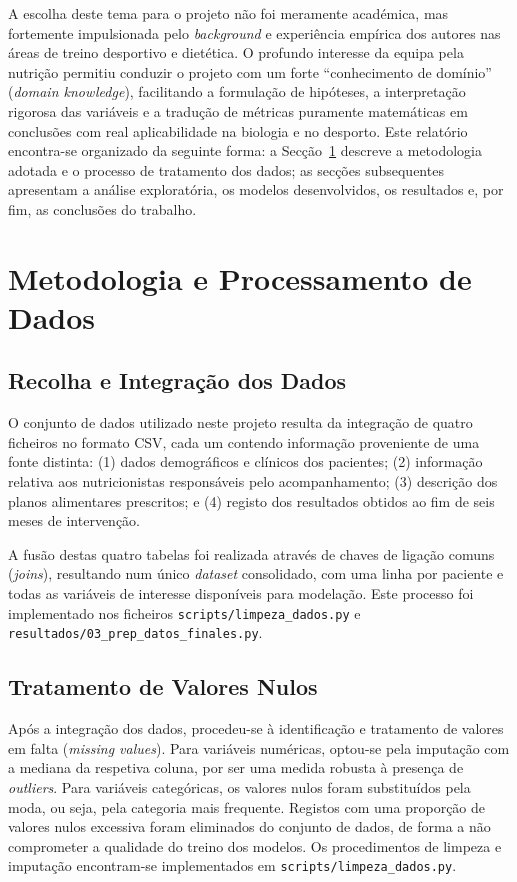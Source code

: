 A escolha deste tema para o projeto não foi meramente académica, mas fortemente impulsionada pelo \textit{background} e experiência empírica dos autores nas áreas de treino desportivo e dietética. O profundo interesse da equipa pela nutrição permitiu conduzir o projeto com um forte ``conhecimento de domínio'' (\textit{domain knowledge}), facilitando a formulação de hipóteses, a interpretação rigorosa das variáveis e a tradução de métricas puramente matemáticas em conclusões com real aplicabilidade na biologia e no desporto.
Este relatório encontra-se organizado da seguinte forma: a Secção~\ref{sec:metodologia} descreve a metodologia adotada e o processo de tratamento dos dados; as secções subsequentes apresentam a análise exploratória, os modelos desenvolvidos, os resultados e, por fim, as conclusões do trabalho.


\section{Metodologia e Processamento de Dados}
\label{sec:metodologia}

\subsection{Recolha e Integração dos Dados}

O conjunto de dados utilizado neste projeto resulta da integração de quatro ficheiros no formato CSV, cada um contendo informação proveniente de uma fonte distinta: (1) dados demográficos e clínicos dos pacientes; (2) informação relativa aos nutricionistas responsáveis pelo acompanhamento; (3) descrição dos planos alimentares prescritos; e (4) registo dos resultados obtidos ao fim de seis meses de intervenção.

A fusão destas quatro tabelas foi realizada através de chaves de ligação comuns (\textit{joins}), resultando num único \textit{dataset} consolidado, com uma linha por paciente e todas as variáveis de interesse disponíveis para modelação. Este processo foi implementado nos ficheiros \texttt{scripts/limpeza\_dados.py} e \texttt{resultados/03\_prep\_datos\_finales.py}.

\subsection{Tratamento de Valores Nulos}

Após a integração dos dados, procedeu-se à identificação e tratamento de valores em falta (\textit{missing values}). Para variáveis numéricas, optou-se pela imputação com a mediana da respetiva coluna, por ser uma medida robusta à presença de \textit{outliers}. Para variáveis categóricas, os valores nulos foram substituídos pela moda, ou seja, pela categoria mais frequente. Registos com uma proporção de valores nulos excessiva foram eliminados do conjunto de dados, de forma a não comprometer a qualidade do treino dos modelos. Os procedimentos de limpeza e imputação encontram-se implementados em \texttt{scripts/limpeza\_dados.py}.

